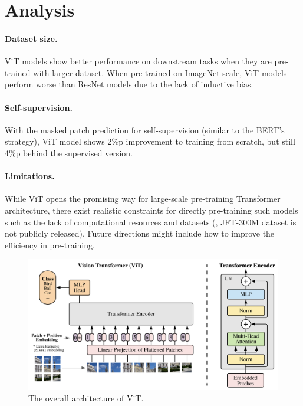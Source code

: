 \documentclass[10pt,twocolumn,letterpaper]{article}
\begin{document}
\section{Analysis}
\paragraph{Dataset size.}
ViT models show better performance on downstream tasks when they are pre-trained with larger dataset.
When pre-trained on ImageNet scale, ViT models perform worse than ResNet models due to the lack of inductive bias.

\paragraph{Self-supervision.}
With the masked patch prediction for self-supervision (similar to the BERT's strategy), ViT model shows 2\%p improvement to training from scratch, but still 4\%p behind the supervised version.


\paragraph{Limitations.}
While ViT opens the promising way for large-scale pre-training Transformer architecture,
there exist realistic constraints for directly pre-training such models such as the lack of computational resources and datasets (\eg, JFT-300M dataset is not publicly released).
Future directions might include how to improve the efficiency in pre-training.




\begin{figure}[t]
    \includegraphics[width=\linewidth]{assets/vit_overview.png}
    \caption{\label{fig:vit_overview}The overall architecture of ViT.}
\end{figure}


{\small


}
\end{document}
